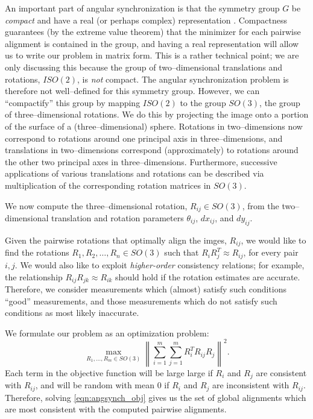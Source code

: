 \documentclass[11pt]{article}
\begin{document}
An important part of angular synchronization is that the symmetry group $G$ be {\em compact} and have a real (or perhaps complex) representation \cite{singer2011angular}.
%
Compactness guarantees (by the extreme value theorem) that the minimizer for each pairwise alignment is contained in the group,
and having a real representation will allow us to write our problem in matrix form. 
%
This is a rather technical point;
we are only discussing this because the group of two--dimensional translations and rotations, $ISO(2)$, is {\em not} compact.
%
The angular synchronization problem is therefore not well--defined for this symmetry group.
%
However, we can ``compactify'' this group by mapping $ISO(2)$ to the group $SO(3)$, the group of three--dimensional rotations.
%
We do this by projecting the image onto a portion of the surface of a (three--dimensional) sphere.
%
Rotations in two--dimensions now correspond to rotations around one principal axis in three--dimensions, and translations in two--dimensions correspond (approximately) to rotations around the other two principal axes in three--dimensions.
%
Furthermore, successive applications of various translations and rotations can be described via multiplication of the corresponding rotation matrices in $SO(3)$.

We now compute the three--dimensional rotation, $R_{ij} \in SO(3)$, from the two--dimensional translation and rotation parameters $\theta_{ij}$, $dx_{ij}$, and $dy_{ij}$.



Given the pairwise rotations that optimally align the imges, $R_{ij}$, we would like to find the rotations $R_1, R_2, \dots, R_n \in SO(3)$ such that $R_i R_j^T \approx R_{ij}$, for every pair $i, j$. 
%
We would also like to exploit {\em higher-order} consistency relations;
for example, the relationship $R_{ij} R_{jk} \approx R_{ik}$ should hold if the rotation estimates are accurate.
%
Therefore, we consider measurements which (almost) satisfy such conditions ``good'' measurements, and those measurements which do not satisfy such conditions as most likely inaccurate.


We formulate our problem as an optimization problem:
\begin{equation} \label{eqn:angsynch_obj}
\max_{R_1, \dots, R_m \in SO(3)} \left\| \sum_{i=1}^{m} \sum_{j=1}^{m} R_i^T R_{ij} R_j \right\|^2.
\end{equation}
%
Each term in the objective function will be large large if $R_i$ and $R_j$ are consistent with $R_{ij}$, and will be random with mean 0 if $R_i$ and $R_j$ are inconsistent with $R_{ij}$.
%
Therefore, solving \eqref{eqn:angsynch_obj} gives us the set of global alignments which are most consistent with the computed pairwise alignments.
\end{document}
